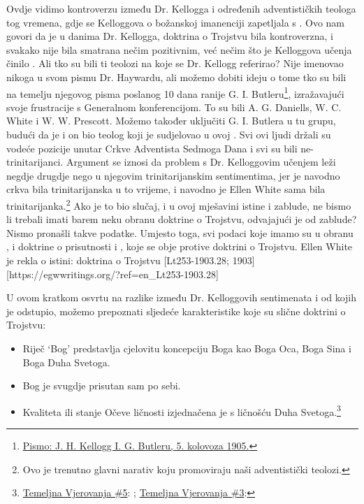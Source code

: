 Ovdje vidimo kontroverzu između Dr. Kellogga i određenih adventističkih teologa tog vremena, gdje se Kelloggova  o božanskoj imanenciji zapetljala s . Ovo nam govori da je u danima Dr. Kellogga, doktrina o Trojstvu bila kontroverzna, i svakako nije bila smatrana nečim pozitivnim, već nečim što je Kelloggova učenja činilo . Ali tko su bili ti teolozi na koje se Dr. Kellogg referirao? Nije imenovao nikoga u svom pismu Dr. Haywardu, ali možemo dobiti ideju o tome tko su bili  na temelju njegovog pisma poslanog 10 dana ranije G. I. Butleru\footnote{\href{https://forgotten-pillar.s3.us-east-2.amazonaws.com/1905-08-05-kellogg-butler.pdf}{Pismo: J. H. Kellogg I. G. Butleru, 5. kolovoza 1905.}}, izražavajući svoje frustracije s Generalnom konferencijom. To su bili A. G. Daniells, W. C. White i W. W. Prescott. Možemo također uključiti G. I. Butlera u tu grupu, budući da je i on bio teolog koji je sudjelovao u ovoj . Svi ovi ljudi držali su vodeće pozicije unutar Crkve Adventista Sedmoga Dana i svi su bili ne-trinitarijanci. Argument se iznosi da problem s Dr. Kelloggovim učenjem leži negdje drugdje nego u njegovim trinitarijanskim sentimentima, jer je navodno crkva bila trinitarijanska u to vrijeme, i navodno je Ellen White sama bila trinitarijanka.\footnote{Ovo je trenutno glavni narativ koju promoviraju naši adventistički teolozi.} Ako je to bio slučaj, i u ovoj mješavini istine i zablude, ne bismo li trebali imati barem neku obranu doktrine o Trojstvu, odvajajući je od zablude? Nismo pronašli takve podatke. Umjesto toga, svi podaci koje imamo su u obranu , i doktrine o prisutnosti i , koje se obje protive doktrini o Trojstvu. Ellen White je rekla o istini: doktrina o Trojstvu [Lt253-1903.28; 1903][https://egwwritings.org/?ref=en\_Lt253-1903.28]

U ovom kratkom osvrtu na razlike između Dr. Kelloggovih sentimenata i  od kojih je odstupio, možemo prepoznati sljedeće karakteristike koje su slične doktrini o Trojstvu:

\begin{itemize}
    \item Riječ ‘Bog’ predstavlja cjelovitu koncepciju Boga kao Boga Oca, Boga Sina i Boga Duha Svetoga.
    \item Bog je svugdje prisutan sam po sebi.
    \item Kvaliteta ili stanje Očeve ličnosti izjednačena je s ličnošću Duha Svetoga.\footnote{\href{https://www.adventist.org/wp-content/uploads/2020/06/ADV-28Beliefs2020.pdf}{Temeljna Vjerovanja \#5}: ; \href{https://www.adventist.org/wp-content/uploads/2020/06/ADV-28Beliefs2020.pdf}{Temeljna Vjerovanja \#3}: }
\end{itemize}

